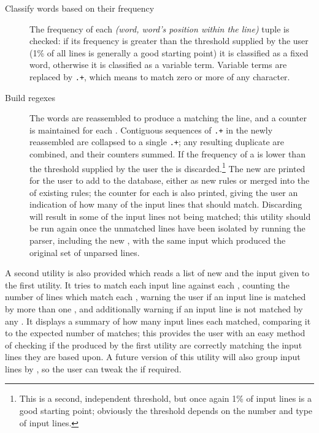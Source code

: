 \documentclass[a4paper,12pt,draft]{article}
\begin{document}
\begin{description}
    \item [Classify words based on their frequency]  The frequency of each
        \textit{(word, word's position within the line)\/} tuple is
        checked: if its frequency is greater than the threshold supplied by
        the user (1\% of all lines is generally a good starting point) it
        is classified as a fixed word, otherwise it is classified as a
        variable term.  Variable terms are replaced by \texttt{.+}, which
        means to match zero or more of any character.  

    \item [Build regexes]  The words are reassembled to produce a \regex{}
        matching the line, and a counter is maintained for each \regex{}.
        Contiguous sequences of \texttt{.+} in the newly reassembled
        \regexes{} are collapsed to a single \texttt{.+}; any resulting
        duplicate \regexes{} are combined, and their counters summed.  If
        the frequency of a \regex{} is lower than the threshold supplied by
        the user the \regex{} is discarded.\footnote{This is a second,
        independent threshold, but once again 1\% of input lines is a good
        starting point; obviously the threshold depends on the number and
        type of input lines.}  The new \regexes{} are printed for the user
        to add to the database, either as new rules or merged into the
        \regexes{} of existing rules; the counter for each \regex{} is also
        printed, giving the user an indication of how many of the input
        lines that \regex{} should match.  Discarding \regexes{} will
        result in some of the input lines not being matched; this utility
        should be run again once the unmatched lines have been isolated by
        running the parser, including the new \regexes{}, with the same
        input which produced the original set of unparsed lines.

\end{description}

A second utility is also provided which reads a list of new \regexes{} and
the input given to the first utility.  It tries to match each input line
against each \regex{}, counting the number of lines which match each
\regex{}, warning the user if an input line is matched by more than one
\regex{}, and additionally warning if an input line is not matched by any
\regex{}.  It displays a summary of how many input lines each \regex{}
matched, comparing it to the expected number of matches; this provides the
user with an easy method of checking if the \regexes{} produced by the
first utility are correctly matching the input lines they are based upon.
A future version of this utility will also group input lines by \regex{},
so the user can tweak the \regexes{} if required.
\end{document}
